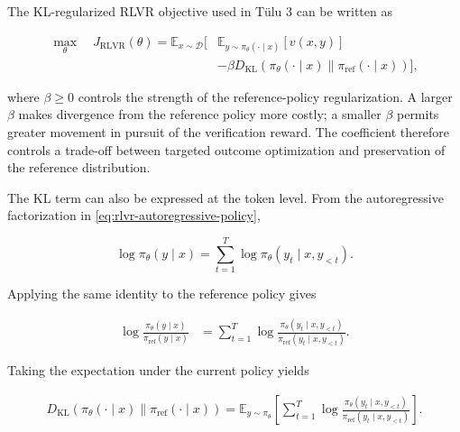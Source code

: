 The KL-regularized RLVR objective used in Tülu 3 can be written as

\begin{equation}
    \boxed{
    \begin{aligned}
    \max_{\theta}\quad
    J_{\mathrm{RLVR}}(\theta)
    =
    \mathbb{E}_{x\sim\mathcal{D}}
    \Big[
        &\mathbb{E}_{y\sim\pi_\theta(\cdot\mid x)}
        [v(x,y)]\\
        &-\beta
        D_{\mathrm{KL}}
        \left(
            \pi_\theta(\cdot\mid x)
            \parallel
            \pi_{\mathrm{ref}}(\cdot\mid x)
        \right)
    \Big],
    \end{aligned}
    }
    \label{eq:rlvr-kl-objective}
\end{equation}

where \(\beta\geq 0\) controls the strength of the reference-policy
regularization. A larger \(\beta\) makes divergence from the reference policy
more costly; a smaller \(\beta\) permits greater movement in pursuit of the
verification reward. The coefficient therefore controls a trade-off between
targeted outcome optimization and preservation of the reference distribution.

The KL term can also be expressed at the token level. From the
autoregressive factorization in \cref{eq:rlvr-autoregressive-policy},

\begin{equation}
    \log \pi_\theta(y\mid x)
    =
    \sum_{t=1}^{T}
    \log \pi_\theta(y_t\mid x,y_{<t}).
    \label{eq:rlvr-log-sequence-prob}
\end{equation}

Applying the same identity to the reference policy gives

\begin{align}
    \log
    \frac{\pi_\theta(y\mid x)}
         {\pi_{\mathrm{ref}}(y\mid x)}
    &=
    \sum_{t=1}^{T}
    \log
    \frac{
        \pi_\theta(y_t\mid x,y_{<t})
    }{
        \pi_{\mathrm{ref}}(y_t\mid x,y_{<t})
    }.
    \label{eq:rlvr-token-kl-decomposition}
\end{align}

Taking the expectation under the current policy yields

\begin{equation}
    \begin{aligned}
    D_{\mathrm{KL}}
    \left(
        \pi_\theta(\cdot\mid x)
        \parallel
        \pi_{\mathrm{ref}}(\cdot\mid x)
    \right)
    =
    \mathbb{E}_{y\sim\pi_\theta}
    \left[
        \sum_{t=1}^{T}
        \log
        \frac{
            \pi_\theta(y_t\mid x,y_{<t})
        }{
            \pi_{\mathrm{ref}}(y_t\mid x,y_{<t})
        }
    \right].
    \end{aligned}
    \label{eq:rlvr-expected-token-kl}
\end{equation}

